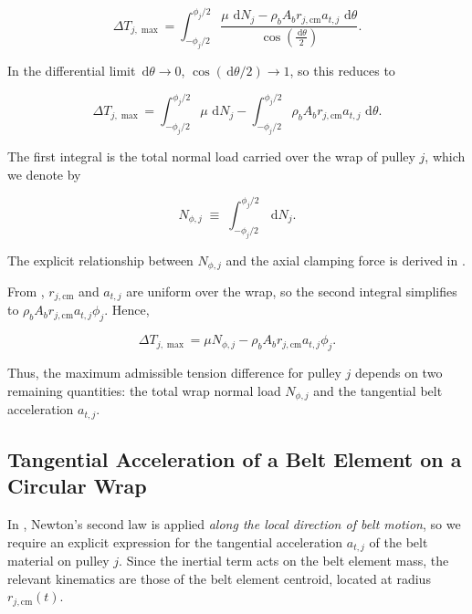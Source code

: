\documentclass[11pt]{article}
\numberwithin{equation}{section}
\newcommand{\dd}{\,\mathrm{d}}
\newcounter{assump}
\begin{document}
\begin{equation}
\Delta T_{j,\max}
=
\int_{-\phi_j/2}^{\phi_j/2}
\frac{
\mu\, \dd N_j
-
\rho_b A_b r_{j,\mathrm{cm}} a_{t,j} \, \dd \theta
}{
\cos\!\left(\frac{\dd\theta}{2}\right)
}.
\label{eq:deltaT_integral}
\end{equation}

In the differential limit \(\dd\theta \to 0\),
\(\cos(\dd\theta/2) \to 1\), so this reduces to

\begin{equation}
\Delta T_{j,\max}
=
\int_{-\phi_j/2}^{\phi_j/2} \mu\, \dd N_j
-
\int_{-\phi_j/2}^{\phi_j/2}
\rho_b A_b r_{j,\mathrm{cm}} a_{t,j} \, \dd \theta.
\label{eq:deltaT_after_limit}
\end{equation}

The first integral is the total normal load carried over the wrap of
pulley \(j\), which we denote by

\begin{equation}
N_{\phi,j}
\;\equiv\;
\int_{-\phi_j/2}^{\phi_j/2} \dd N_j.
\label{eq:Nphi_def}
\end{equation}

The explicit relationship between \(N_{\phi,j}\) and the axial
clamping force is derived in .

From ,
\(r_{j,\mathrm{cm}}\) and \(a_{t,j}\) are uniform over the wrap,
so the second integral simplifies to
\(
\rho_b A_b r_{j,\mathrm{cm}} a_{t,j} \phi_j
\).
Hence,

\begin{equation}
\Delta T_{j,\max}
=
\mu N_{\phi,j}
-
\rho_b A_b r_{j,\mathrm{cm}} a_{t,j} \phi_j.
\label{eq:deltaT_final}
\end{equation}

Thus, the maximum admissible tension difference for pulley \(j\)
depends on two remaining quantities:
the total wrap normal load \(N_{\phi,j}\) and the tangential
belt acceleration \(a_{t,j}\).

\subsection{Tangential Acceleration of a Belt Element on a Circular Wrap}
\label{sec:belt_tangential_accel}

In , Newton's second law is applied \emph{along the local
direction of belt motion}, so we require an explicit expression for the
tangential acceleration \(a_{t,j}\) of the belt material on pulley \(j\).
Since the inertial term acts on the belt element mass, the relevant kinematics
are those of the belt element centroid, located at radius
\(r_{j,\mathrm{cm}}(t)\).
\end{document}
